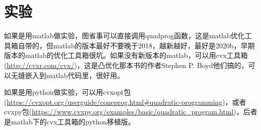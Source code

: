 \documentclass{ctexart}
\begin{document}
\section{实验}

如果是用matlab做实验，图省事可以直接调用quadprog函数，这是matlab优化工具箱自带的，但matlab的版本最好不要晚于2018，越新越好，最好是2020b，早期版本的matlab的优化工具箱很坑。如果没有新版本的matlab，可以用cvx工具箱(\url{http://cvxr.com/cvx/})，这是凸优化那本书的作者Stephen P. Boyd他们搞的，可以无缝嵌入到matlab代码里，很好用。

如果是用python做实验，可以用cvxopt包(\url{https://cvxopt.org/userguide/coneprog.html#quadratic-programming})，或者cvxpy包(\url{https://www.cvxpy.org/examples/basic/quadratic_program.html})，后者是matlab下的cvx工具箱的python移植版。
\end{document}
